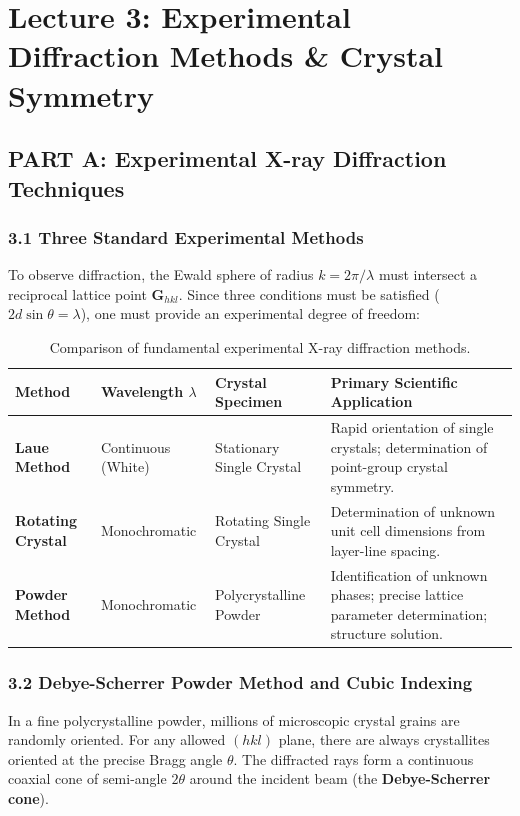 \documentclass[11pt,a4paper]{article}
\begin{document}
\newpage

\section{Lecture 3: Experimental Diffraction Methods \& Crystal Symmetry}

\subsection{PART A: Experimental X-ray Diffraction Techniques}

\subsubsection{3.1 Three Standard Experimental Methods}
To observe diffraction, the Ewald sphere of radius $k = 2\pi/\lambda$ must intersect a reciprocal lattice point $\mathbf{G}_{hkl}$. Since three conditions must be satisfied ($2d\sin\theta = \lambda$), one must provide an experimental degree of freedom:

\begin{table}[htbp]
\centering
\small
\begin{tabular}{lllp{6cm}}
\toprule
\textbf{Method} & \textbf{Wavelength $\lambda$} & \textbf{Crystal Specimen} & \textbf{Primary Scientific Application} \\
\midrule
\textbf{Laue Method} & Continuous (White) & Stationary Single Crystal & Rapid orientation of single crystals; determination of point-group crystal symmetry. \\
\textbf{Rotating Crystal} & Monochromatic & Rotating Single Crystal & Determination of unknown unit cell dimensions from layer-line spacing. \\
\textbf{Powder Method} & Monochromatic & Polycrystalline Powder & Identification of unknown phases; precise lattice parameter determination; structure solution. \\
\bottomrule
\end{tabular}
\caption{Comparison of fundamental experimental X-ray diffraction methods.}
\label{tab:xrd_methods}
\end{table}

\subsubsection{3.2 Debye-Scherrer Powder Method and Cubic Indexing}
In a fine polycrystalline powder, millions of microscopic crystal grains are randomly oriented. For any allowed $(hkl)$ plane, there are always crystallites oriented at the precise Bragg angle $\theta$. The diffracted rays form a continuous coaxial cone of semi-angle $2\theta$ around the incident beam (the \textbf{Debye-Scherrer cone}).
\end{document}
